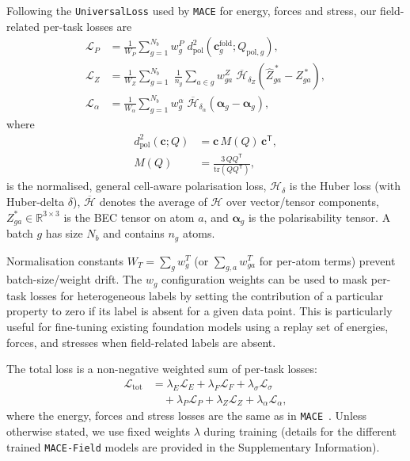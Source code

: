 \documentclass[aps,physrev,graphicx,amsmath,amssymb,
               reprint,superscriptaddress]{revtex4-2}
\begin{document}
Following the \texttt{UniversalLoss} used by \texttt{MACE} for energy, forces and stress, our field-related per-task losses are
\begin{align}
\mathcal L_P &= \frac{1}{W_P}\sum_{g=1}^{N_b} w^P_g\;
d_{\mathrm{pol}}^2\!\left(\mathbf c^{\mathrm{fold}}_g;Q_{\mathrm{pol},g}\right), \label{eq:L_P}\\[3pt]
\mathcal L_Z &= \frac{1}{W_Z}\sum_{g=1}^{N_b}\;\frac{1}{n_g}\sum_{a\in g} w^Z_{ga}\;
\overline{\mathcal H}_{\delta_Z}\!\left(
{\hat Z}^{\,*}_{ga}- Z^{\,*}_{ga}\right), \label{eq:L_Z}\\[3pt]
\mathcal L_\alpha &= \frac{1}{W_\alpha}\sum_{g=1}^{N_b} w^\alpha_g\;
\overline{\mathcal H}_{\delta_\alpha}\!\left(
{\hat{\boldsymbol\alpha}}_{g}-{\boldsymbol\alpha}_{g}\right),
\label{eq:L_alpha}
\end{align}
where
\begin{align}
d_{\mathrm{pol}}^2(\mathbf c;Q) &= \mathbf c\,M(Q)\,\mathbf c^\mathsf{T},\nonumber\\
M(Q) &= \frac{3\,Q Q^\mathsf{T}}{\mathrm{tr}(Q Q^\mathsf{T})},
\label{eq:pol_metric}
\end{align}
is the normalised, general cell-aware polarisation loss, $\mathcal H _{\delta}$ is the Huber loss (with Huber-delta $\delta$), $\overline{\mathcal H}$ denotes the average of $\mathcal H$ over vector/tensor components, $Z^*_{ga}\in\mathbb R^{3\times 3}$ is the BEC tensor on atom $a$, and $\boldsymbol\alpha_g$ is the polarisability tensor. A batch $g$ has size $N_b$ and contains $n_g$ atoms.

Normalisation constants $W_T=\sum_g w^T_g$ (or $\sum_{g,a}w^T_{ga}$ for per-atom terms) prevent batch-size/weight drift. The $w_g$ configuration weights can be used to mask per-task losses for heterogeneous labels by setting the contribution of a particular property to zero if its label is absent for a given data point. This is particularly useful for fine-tuning existing foundation models using a replay set of energies, forces, and stresses when field-related labels are absent.

The total loss is a non-negative weighted sum of per-task losses:
\begin{align}
\mathcal L_{\mathrm{tot}} &=
\lambda_E \mathcal L_E + \lambda_F \mathcal L_F + \lambda_\sigma \mathcal L_\sigma \nonumber \\
&\quad+ \lambda_P \mathcal L_P + \lambda_Z \mathcal L_Z + \lambda_\alpha \mathcal L_\alpha , 
\label{eq:L_total}
\end{align}
where the energy, forces and stress losses are the same as in \texttt{MACE}~\cite{batatia-2022-mace}. Unless otherwise stated, we use fixed weights $\lambda$ during training (details for the different trained \texttt{MACE-Field} models are provided in the Supplementary Information).
\end{document}
